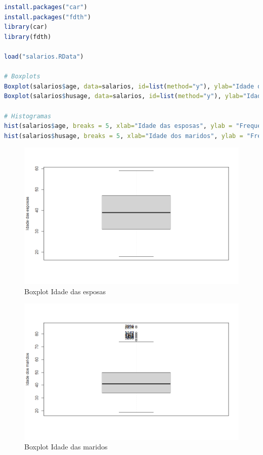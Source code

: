 \begin{lstlisting}[language=R, style=input]
install.packages("car")
install.packages("fdth")
library(car)
library(fdth)

load("salarios.RData")

# Boxplots
Boxplot(salarios$age, data=salarios, id=list(method="y"), ylab="Idade das esposas")
Boxplot(salarios$husage, data=salarios, id=list(method="y"), ylab="Idade dos maridos")

# Histogramas
hist(salarios$age, breaks = 5, xlab="Idade das esposas", ylab = "Frequency")
hist(salarios$husage, breaks = 5, xlab="Idade dos maridos", ylab = "Frequency")
\end{lstlisting}
\begin{figure}[H]
\centering
\includegraphics[width=1\linewidth]{apendices/fig/4_IAA004_1.png}
\caption{Boxplot Idade das esposas}
\end{figure}
\begin{figure}[H]
\centering
\includegraphics[width=1\linewidth]{apendices/fig/4_IAA004_2.png}
\caption{Boxplot Idade das maridos}
\end{figure}
